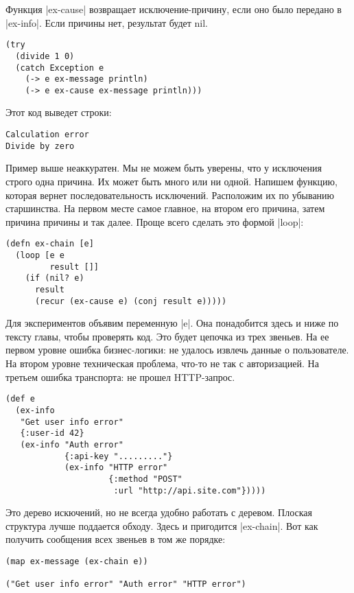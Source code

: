 Функция \spverb|ex-cause| возвращает исключение-причину, если оно было передано в
\spverb|ex-info|. Если причины нет, результат будет nil.

\begin{verbatim}
(try
  (divide 1 0)
  (catch Exception e
    (-> e ex-message println)
    (-> e ex-cause ex-message println)))
\end{verbatim}

Этот код выведет строки:

\begin{verbatim}
Calculation error
Divide by zero
\end{verbatim}

Пример выше неаккуратен. Мы не можем быть уверены, что у исключения строго одна
причина. Их может быть много или ни одной. Напишем функцию, которая вернет
последовательность исключений. Расположим их по убыванию старшинства. На первом
месте самое главное, на втором его причина, затем причина причины и так
далее. Проще всего сделать это формой \spverb|loop|:

\begin{verbatim}
(defn ex-chain [e]
  (loop [e e
         result []]
    (if (nil? e)
      result
      (recur (ex-cause e) (conj result e)))))
\end{verbatim}

Для экспериментов объявим переменную \spverb|e|. Она понадобится здесь и ниже по тексту
главы, чтобы проверять код. Это будет цепочка из трех звеньев. На ее первом
уровне ошибка бизнес-логики: не удалось извлечь данные о пользователе. На втором
уровне техническая проблема, что-то не так с авторизацией. На третьем ошибка
транспорта: не прошел HTTP-запрос.

\begin{verbatim}
(def e
  (ex-info
   "Get user info error"
   {:user-id 42}
   (ex-info "Auth error"
            {:api-key "........."}
            (ex-info "HTTP error"
                     {:method "POST"
                      :url "http://api.site.com"}))))
\end{verbatim}

Это дерево искючений, но не всегда удобно работать с деревом. Плоская структура
лучше поддается обходу. Здесь и пригодится \spverb|ex-chain|. Вот как получить
сообщения всех звеньев в том же порядке:

\begin{verbatim}
(map ex-message (ex-chain e))

("Get user info error" "Auth error" "HTTP error")
\end{verbatim}

